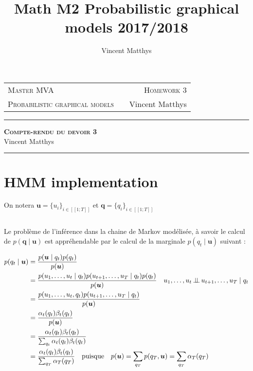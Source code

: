 \documentclass[12pt,a4paper,onecolumn]{article}
\title{Math M2 Probabilistic graphical models 2017/2018}
\author{Vincent Matthys}
\begin{document}
\begin{tabularx}{0.8\textwidth}{@{} l X r @{} }
	{\textsc{Master MVA}}                   &  & \textsc{Homework 3} \\
	\textsc{Probabilistic graphical models} &  & {Vincent Matthys}   \\
\end{tabularx}
\vspace{1.5cm}
\begin{center}
	\rule[11pt]{5cm}{0.5pt}

	\textbf{\LARGE \textsc{Compte-rendu du devoir 3}}
	\vspace{0.5cm}\\
	Vincent Matthys\\
	\rule{5cm}{0.5pt}
	\vspace{1.5cm}
\end{center}

\section{HMM implementation}

On notera \(\bm{u} = \{u_i\}_{i \in [\![1;T]\!]}\) et \(\bm{q} = \{q_i\}_{i \in [\![1;T]\!]}\)

\subsection{}

Le problème de l'inférence dans la chaine de Markov modélisée, à savoir le calcul de \(p(\bm{q} \mid \bm{u})\) est appréhendable par le calcul de la marginale \(p(q_t \mid \bm{u})\) suivant :

\begin{equation}
	\begin{split}
		p(q_t \mid \bm{u}) &= \frac{p(\bm{u} \mid q_t)p(q_t)}{p(\bm{u})}\\
		&= \frac{p(u_1,\dots,u_t \mid q_t)p(u_{t+1},\dots,u_T \mid q_t) p(q_t)}{p(\bm{u})} \quad u_1,\dots,u_t \,\bot\!\!\!\bot\, u_{t+1},\dots,u_T \mid q_t\\
		&= \frac{p(u_1,\dots,u_t, q_t)p(u_{t+1},\dots,u_T \mid q_t)}{p(\bm{u})}\\
		&= \frac{\alpha_t(q_t)\beta_t(q_t)}{p(\bm{u})}\\
		&= \frac{\alpha_t(q_t)\beta_t(q_t)}{\sum_{q_t}\alpha_t(q_t)\beta_t(q_t)}\\
		&= \frac{\alpha_t(q_t)\beta_t(q_t)}{\sum_{q_T}\alpha_T(q_T)} \quad \text{puisque} \quad p(\bm{u}) = \sum_{q_T}p(q_T, \bm{u}) = \sum_{q_T}\alpha_T(q_T)\\
	\end{split}
	\label{filtering_eq}
\end{equation}
\end{document}
